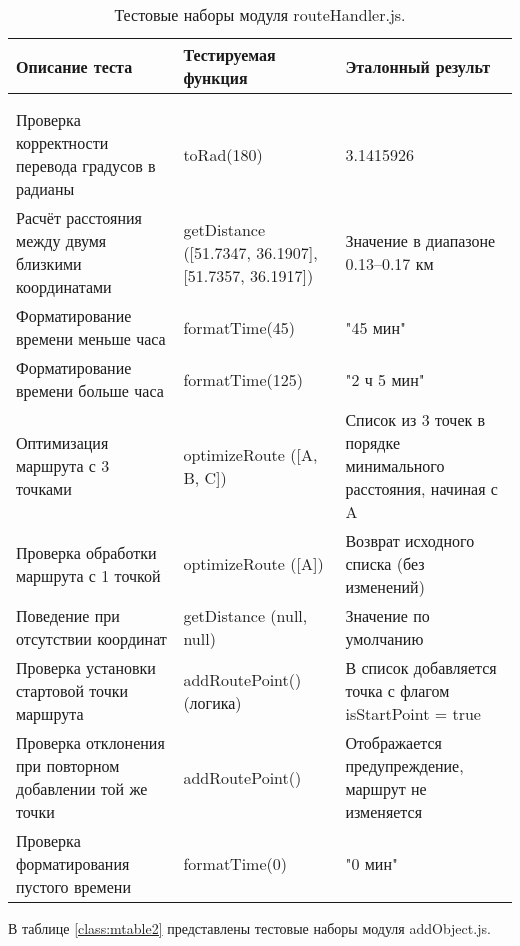 \begin{xltabular}{\textwidth}{|X|p{4cm}|X|}
	\caption{Тестовые наборы модуля routeHandler.js.\label{class:mtable1}}\\
	\hline \centrow Описание теста & \centrow Тестируемая функция & \centrow Эталонный результ\\
	\hline {} &  & \\ \hline
	\endfirsthead
	 &  & \\ \hline
	\finishhead
	Проверка корректности перевода градусов в радианы & toRad(180) & 3.1415926\\
	\hline Расчёт расстояния между двумя близкими координатами & getDistance ([51.7347, 36.1907], [51.7357, 36.1917]) & Значение в диапазоне 0.13–0.17 км\\
	\hline Форматирование времени меньше часа & formatTime(45) & "45 мин"\\
	\hline Форматирование времени больше часа & formatTime(125) & "2 ч 5 мин"\\
	\hline Оптимизация маршрута с 3 точками & optimizeRoute ([A, B, C]) & Список из 3 точек в порядке минимального расстояния, начиная с A\\
	\hline Проверка обработки маршрута с 1 точкой & optimizeRoute ([A]) & Возврат исходного списка (без изменений)\\
	\hline Поведение при отсутствии координат & getDistance (null, null) & Значение по умолчанию\\
	\hline Проверка установки стартовой точки маршрута & addRoutePoint() (логика) & В список добавляется точка с флагом isStartPoint = true\\
	\hline Проверка отклонения при повторном добавлении той же точки & addRoutePoint() & Отображается предупреждение, маршрут не изменяется\\
	\hline Проверка форматирования пустого времени & formatTime(0) & "0 мин"\\
\end{xltabular}

В таблице \ref{class:mtable2} представлены тестовые наборы модуля addObject.js.


